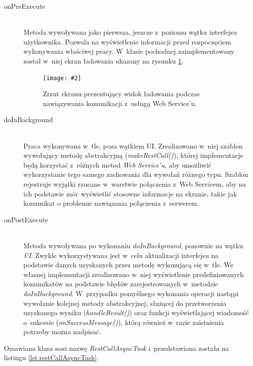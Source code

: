 \documentclass[11pt]{aghdpl}
\newcommand{\customWidthPicture}[3]{
\begin{figure}[h!]
	\centering
		\texttt{[image: \#2]}
	\caption{#3}
	\label{fig:#2}
\end{figure}
}
\begin{document}
\begin{description}
	\item[onPreExecute] \hfill \\
	Metoda wywoływana jako pierwsza, jeszcze z~poziomu wątku interfejsu użytkownika. Pozwala na wyświetlenie informacji przed rozpoczęciem wykonywania właściwej pracy. W~klasie pochodnej zaimplementowany został w~niej ekran ładowania ukazany na rysunku \ref{fig:mobileLadowanie}.
	\customWidthPicture{.3}{mobileLadowanie}{Zrzut ekranu prezentujący widok ładowania podczas nawiązywania komunikacji z~usługą Web Service'u.}
	\item[doInBackground] \hfill \\
	Praca wykonywana w~tle, poza wątkiem UI. Zrealizowano w~niej szablon wywołujący metodę abstrakcyjną (\emph{makeRestCall()}), której implementacje będą korzystać z~różnych metod \emph{Web Service'u}, aby umożliwić wykorzystanie tego samego zachowania dla wywołań różnego typu. Szablon rejestruje wyjątki rzucane w~warstwie połączenia z~Web Servicem, aby na ich podstawie móc wyświetlić stosowne informacje na ekranie, takie jak komunikat o problemie nawiązania połączenia z~serwerem.
	\item[onPostExecute] \hfill \\
	Metoda wywoływana po wykonaniu \emph{doInBackground}, ponownie na wątku \emph{UI}. Zwykle wykorzystywana jest w~celu aktualizacji interfejsu na podstawie danych uzyskanych przez metodę wykonującą się w~tle. We własnej implementacji zrealizowano w~niej wyświetlenie predefiniowanych komunikatów na podstawie błędów zarejestrowanych w~metodzie \emph{doInBackground}. W~przypadku pomyślnego wykonania operacji nastąpi wywołanie kolejnej metody abstrakcyjnej, służącej do przetworzenia uzyskanego wyniku (\emph{handleResult()}) oraz funkcji wyświetlającej wiadomość o~sukcesie (\emph{onSuccessMessage()}), którą również w~razie zaistnienia potrzeby można nadpisać.
\end{description}


Omawiana klasa nosi nazwę \emph{RestCallAsyncTask} i~przedstawiona została na listingu \ref{lst:restCallAsyncTask}.
\end{document}
